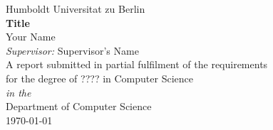 \documentclass[11pt]{article}
\begin{document}


\begin{titlepage}



\begin{center}
{\LARGE Humboldt Universitat zu Berlin}\\[1.5cm]
\linespread{1.2}\huge {\bfseries Title}\\[1.5cm]
\linespread{1}
{\Large Your Name}\\[1cm]
{\large \emph{Supervisor:} Supervisor's Name}\\[1cm] %
\large A report submitted in partial fulfilment of the requirements\\ for the degree of ???? in Computer Science\\[0.3cm] 
\textit{in the}\\[0.3cm]
Department of Computer Science\\[2cm]
\today
\end{center}

\end{titlepage}



\newpage

\tableofcontents

\newpage

\listoffigures

\newpage

\listoftables



\newpage











 
 


\begin{appendices}


\end{appendices}
\end{document}
